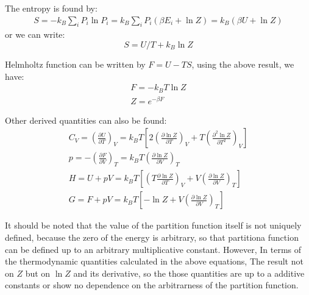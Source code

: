 \documentclass{article}
\newcommand{\pfrac}[2]{\frac{\partial #1}{\partial #2}}
\begin{document}
The entropy is found by:
\begin{align}
    S = -k_B \sum_i P_i \ln P_i = k_B \sum_i P_i (\beta E_i + \ln Z) = k_B (\beta U + \ln Z)
\end{align}
or we can write:
\begin{equation}
    S = U/T + k_B \ln Z
\end{equation}

Helmholtz function can be written by $F = U - TS$, using the above result, we have:
\begin{gather}
    F = -k_B T \ln Z \\
    Z = e^{-\beta F}
\end{gather}

Other derived quantities can also be found:
\begin{gather}
    C_V = \left(\pfrac{U}{T}\right)_V = k_B T \left[ 2\left(\pfrac{\ln Z}{T}\right)_V + T \left( \frac{\partial^2\ln Z}{\partial T^2} \right)_V \right] \\
    p = - \left(\pfrac{F}{V}\right)_T = k_B T \left( \pfrac{\ln Z}{V} \right)_T \\
    H = U + pV =  k_B T \left[ \left( T\pfrac{\ln Z}{T}\right)_V + V \left( \pfrac{\ln Z}{V} \right)_T \right] \\
    G = F + pV =  k_B T \left[ -\ln Z + V \left( \pfrac{\ln Z}{V} \right)_T \right]
\end{gather}

It should be noted that the value of the partition function itself
is not uniquely defined, because the zero of the energy is arbitrary,
so that partitiona function can be defined up to an arbitrary multiplicative constant.
However, In terms of the thermodynamic quantities calculated in the above equations,
The result not on $Z$ but on $\ln Z$ and its derivative, so the 
those quantities are up to a additive constants or show no dependence on the 
arbitrarness of the partition function.
\end{document}

